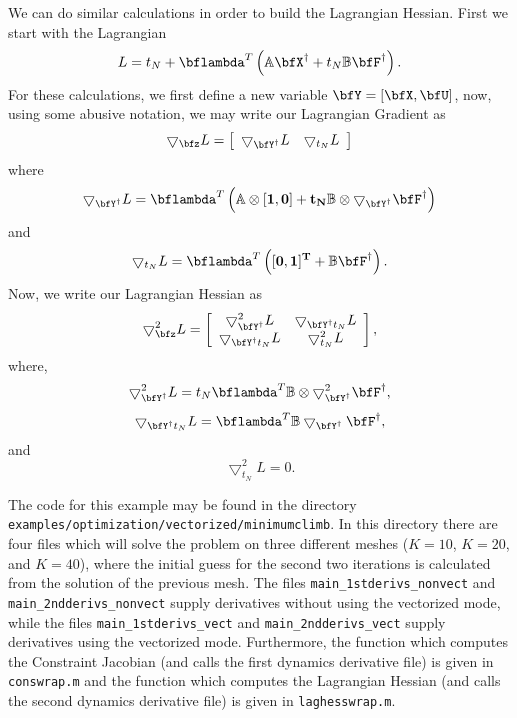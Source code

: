 \documentclass[10pt,pdftex]{article}
\begin{document}
We can do similar calculations in order to build the Lagrangian Hessian. First we start with the Lagrangian
\begin{equation}
L = t_N + \bflambda^T\left(\mathbb{A}\bfX^{\dag} + t_N\mathbb{B}\bfF^{\dag}\right).
\end{equation}
For these calculations, we first define a new variable $\bfY = [\bfX, \bfU]$, now, using some abusive notation, we may write our Lagrangian Gradient as
\begin{equation}
\bigtriangledown _{\bfz} L = 
\left[ \begin{array}{cc}
\bigtriangledown _{\bfY^{\dag}} L & \bigtriangledown _{t_N} L
\end{array}\right]
\end{equation}
where
\begin{equation}
\bigtriangledown _{\bfY^{\dag}} L = \bflambda^T\left(\mathbb{A}\otimes[\bf1, \bf0] + t_N\mathbb{B}\otimes \bigtriangledown _{\bfY^{\dag}} \bfF^{\dag}\right)
\end{equation}
and
\begin{equation}
\bigtriangledown _{t_N} L = \bflambda ^T\left([\bf0, 1]^T + \mathbb{B}\bfF^{\dag}\right).
\end{equation}
Now, we write our Lagrangian Hessian as
\begin{equation}
\bigtriangledown _{\bfz}^2 L = \left[
\begin{array}{cc}
\bigtriangledown _{\bfY^{\dag}}^2 L & \bigtriangledown _{\bfY^{\dag}t_N} L \\
\bigtriangledown _{\bfY^{\dag}t_N} L & \bigtriangledown _{t_N}^2 L 
\end{array} \right],
\end{equation}
where,
\begin{equation}
\bigtriangledown _{\bfY^{\dag}}^2 L  = t_N \bflambda ^T  \mathbb{B} \otimes \bigtriangledown _{\bfY^{\dag}}^2 \bfF^{\dag},
\end{equation}
\begin{equation}
\bigtriangledown _{\bfY^{\dag}t_N} L = \bflambda ^T \mathbb{B}\bigtriangledown_{\bfY^{\dag}} \bfF^{\dag},
\end{equation}
and
\begin{equation}
\bigtriangledown _{t_N}^2 L  = 0.
\end{equation}

The code for this example may be found in the directory \texttt{examples/optimization/vectorized/minimumclimb}. In this directory there are four files which will solve the problem on three different meshes ($K = 10$, $K = 20$, and $K = 40$), where the initial guess for the second two iterations is calculated from the solution of the previous mesh. The files \texttt{main\_1stderivs\_nonvect} and \texttt{main\_2ndderivs\_nonvect} supply derivatives without using the vectorized mode, while the files \texttt{main\_1stderivs\_vect} and \texttt{main\_2ndderivs\_vect} supply derivatives using the vectorized mode. Furthermore, the function which computes the Constraint Jacobian (and calls the first dynamics derivative file) is given in \texttt{conswrap.m} and the function which computes the Lagrangian Hessian (and calls the second dynamics derivative file) is given in \texttt{laghesswrap.m}.
\end{document}

